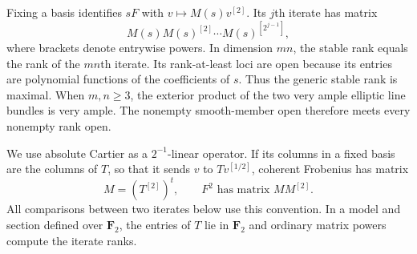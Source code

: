 \documentclass[11pt]{article}
\theoremstyle{definition}\newtheorem{definition}[theorem]{Definition}
\theoremstyle{remark}\newtheorem{remark}[theorem]{Remark}
\newcommand{\FF}{\mathbf F}
\begin{document}
Fixing a basis identifies $sF$ with $v\mapsto M(s)v^{[2]}$. Its $j$th iterate has matrix
\[
 M(s)M(s)^{[2]}\cdots M(s)^{[2^{j-1}]},
\]
where brackets denote entrywise powers. In dimension $mn$, the stable rank equals the rank of the $mn$th iterate. Its rank-at-least loci are open because its entries are polynomial functions of the coefficients of $s$. Thus the generic stable rank is maximal. When $m,n\ge3$, the exterior product of the two very ample elliptic line bundles is very ample. The nonempty smooth-member open therefore meets every nonempty rank open.

We use absolute Cartier as a $2^{-1}$-linear operator. If its columns in a fixed basis are the columns of $T$, so that it sends $v$ to $T v^{[1/2]}$, coherent Frobenius has matrix
\begin{equation}\label{eq:twist}
 M=(T^{[2]})^{t},\qquad F^2\text{ has matrix }MM^{[2]}.
\end{equation}
All comparisons between two iterates below use this convention. In a model and section defined over $\FF_2$, the entries of $T$ lie in $\FF_2$ and ordinary matrix powers compute the iterate ranks.
\end{document}
